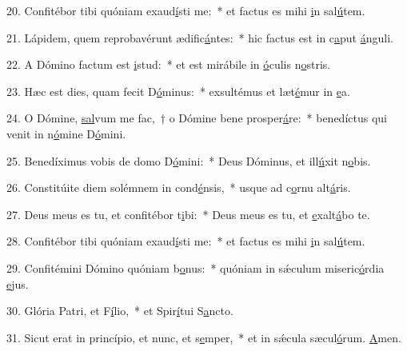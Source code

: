 20. Confitébor tibi quóniam exaud\uline{í}sti me:~* et factus es mihi \uline{i}n sal\uline{ú}tem.\par 
21. Lápidem, quem reprobavérunt ædific\uline{á}ntes:~* hic factus est in c\uline{a}put \uline{á}nguli.\par 
22. A Dómino factum est \uline{i}stud:~* et est mirábile in \uline{ó}culis n\uline{o}stris.\par 
23. Hæc est dies, quam fecit D\uline{ó}minus:~* exsultémus et læt\uline{é}mur in \uline{e}a.\par 
24. O Dómine, \uline{sal}vum me fac,~† o Dómine bene prosper\uline{á}re:~* benedíctus qui venit in n\uline{ó}mine D\uline{ó}mini.\par 
25. Benedíximus vobis de domo D\uline{ó}mini:~* Deus Dóminus, et ill\uline{ú}xit n\uline{o}bis.\par 
26. Constitúite diem solémnem in cond\uline{é}nsis,~* usque ad c\uline{o}rnu alt\uline{á}ris.\par 
27. Deus meus es tu, et confitébor t\uline{i}bi:~* Deus meus es tu, et \uline{e}xalt\uline{á}bo te.\par 
28. Confitébor tibi quóniam exaud\uline{í}sti me:~* et factus es mihi \uline{i}n sal\uline{ú}tem.\par 
29. Confitémini Dómino quóniam b\uline{o}nus:~* quóniam in sǽculum miseric\uline{ó}rdia \uline{e}jus.\par 
30. Glória Patri, et F\uline{í}lio,~* et Spir\uline{í}tui S\uline{a}ncto.\par 
31. Sicut erat in princípio, et nunc, et s\uline{e}mper,~* et in sǽcula sæcul\uline{ó}rum. \uline{A}men.\par 
